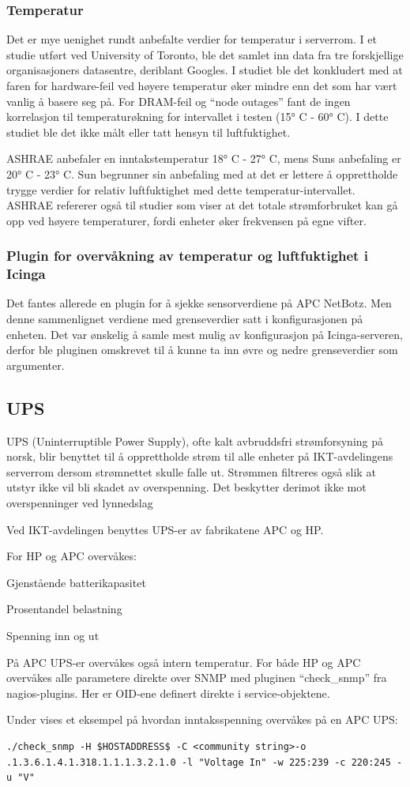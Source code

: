 \subsubsection{Temperatur}
Det er mye uenighet rundt anbefalte verdier for temperatur i serverrom. I et studie utført ved University of Toronto\cite{torontopaper}, ble det samlet inn data fra tre forskjellige organisasjoners datasentre, deriblant Googles. I studiet ble det konkludert med at faren for hardware-feil ved høyere temperatur øker mindre enn det som har vært vanlig å basere seg på. For DRAM-feil og ``node outages'' fant de ingen korrelasjon til temperaturøkning for intervallet i testen (15° C - 60° C). I dette studiet ble det ikke målt eller tatt hensyn til luftfuktighet. 

ASHRAE anbefaler en inntakstemperatur 18° C - 27° C, mens Suns anbefaling er 20° C - 23° C. Sun begrunner sin anbefaling med at det er lettere å opprettholde trygge verdier for relativ luftfuktighet med dette temperatur-intervallet. ASHRAE refererer også til studier som viser at det totale strømforbruket kan gå opp ved høyere temperaturer, fordi enheter øker frekvensen på egne vifter\cite{datacentertemp}.

\subsubsection{Plugin for overvåkning av temperatur og luftfuktighet i Icinga}
Det fantes allerede en plugin for å sjekke sensorverdiene på APC NetBotz\cite{checknetbotz}. Men denne sammenlignet verdiene med grenseverdier satt i konfigurasjonen på enheten. Det var ønskelig å samle mest mulig av konfigurasjon på Icinga-serveren, derfor ble pluginen omskrevet til å kunne ta inn øvre og nedre grenseverdier som argumenter.

\subsection{UPS}
UPS (Uninterruptible Power Supply), ofte kalt avbruddsfri strømforsyning på norsk, blir benyttet til å opprettholde strøm til alle enheter på IKT-avdelingens serverrom dersom strømnettet skulle falle ut. Strømmen filtreres også slik at utstyr ikke vil bli skadet av overspenning. Det beskytter derimot ikke mot overspenninger ved lynnedslag %

Ved IKT-avdelingen benyttes UPS-er av fabrikatene APC og HP.

For HP og APC overvåkes:
\begin{itemize*}
 	\item Gjenstående batterikapasitet
	\item Prosentandel belastning
	\item Spenning inn og ut
\end{itemize*}
På APC UPS-er overvåkes også intern temperatur. For både HP og APC overvåkes alle parametere direkte over SNMP med pluginen ``check\_snmp'' fra nagios-plugins. Her er OID-ene definert direkte i service-objektene.

Under vises et eksempel på hvordan inntaksspenning overvåkes på en APC UPS:
\begin{lstlisting}[style=example]
./check_snmp -H $HOSTADDRESS$ -C <community string>-o .1.3.6.1.4.1.318.1.1.1.3.2.1.0 -l "Voltage In" -w 225:239 -c 220:245 -u "V"
\end{lstlisting}
